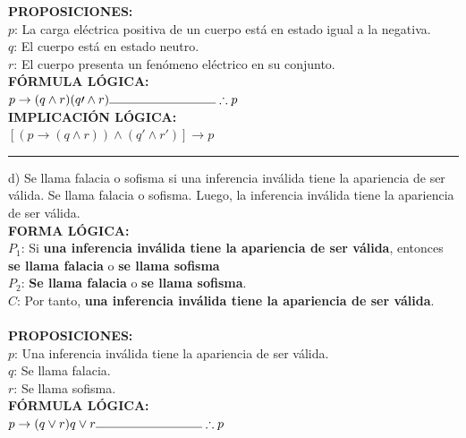 \documentclass[letterpaper,12pt]{article}
\begin{document}
\begin{sloppypar}
\textbf{PROPOSICIONES:} \\ 
$p$: La carga eléctrica positiva de un cuerpo está en estado igual a la negativa. \\ 
$q$: El cuerpo está en estado neutro. \\ 
$r$: El cuerpo presenta un fenómeno eléctrico en su conjunto.
\vspace{0.3cm}\\ 
\textbf{FÓRMULA LÓGICA:} \\ 
$p \rightarrow (q \wedge r) \\ (q\prime \wedge r)\\ \noindent\rule{3cm}{0.4pt} \\ \therefore p $
\vspace{0.3cm}\\ 
\textbf{IMPLICACIÓN LÓGICA:} \\
$[(p \rightarrow (q \wedge r)) \wedge (q\prime \wedge r \prime)] \rightarrow p$ 
\vspace{0.3cm} 
\hrule 
\vspace{0.3cm} 
d) Se llama falacia o sofisma si una inferencia inválida tiene la apariencia de ser válida. Se llama falacia o sofisma.
Luego, la inferencia inválida tiene la apariencia de ser válida.
\vspace{0.3cm}\\ 
\textbf{FORMA LÓGICA:} \\ 
$P_1$: Si \textcolor[rgb]{1,0,0}{\textbf{una inferencia inválida tiene la apariencia de ser válida}}, entonces \textcolor[rgb]{0.2,0.5,0.7}{\textbf{se llama falacia}} o \textcolor[rgb]{0.2,0.7,0.5}{\textbf{se llama sofisma}} \\ 
$P_2$: \textcolor[rgb]{0.2,0.5,0.7}{\textbf{Se llama falacia}} o \textcolor[rgb]{0.2,0.7,0.5}{\textbf{se llama sofisma}}. \\ 
$C$: Por tanto, \textcolor[rgb]{1,0,0}{\textbf{una inferencia inválida tiene la apariencia de ser válida}}. \\ 
\vspace{0.3cm}\\ 
\textbf{PROPOSICIONES:} \\ 
$p$: Una inferencia inválida tiene la apariencia de ser válida. \\ 
$q$: Se llama falacia. \\ 
$r$: Se llama sofisma. 
\vspace{0.3cm}\\ 
\textbf{FÓRMULA LÓGICA:} \\ 
$p \rightarrow (q \vee r) \\ q \vee r \\ \noindent\rule{3cm}{0.4pt} \\ \therefore p$

\end{sloppypar}
\end{document}
